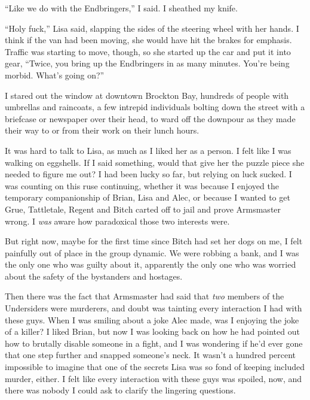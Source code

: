 ``Like we do with the Endbringers,'' I said.  I sheathed my knife.



``Holy fuck,'' Lisa said, slapping the sides of the steering wheel with her hands.  I think if the van had been moving, she would have hit the brakes for emphasis.  Traffic was starting to move, though, so she started up the car and put it into gear, ``Twice, you bring up the Endbringers in as many minutes.  You're being morbid.  What's going on?''



I stared out the window at downtown Brockton Bay, hundreds of people with umbrellas and raincoats, a few intrepid individuals bolting down the street with a briefcase or newspaper over their head, to ward off the downpour as they made their way to or from their work on their lunch hours.



It was hard to talk to Lisa, as much as I liked her as a person.  I felt like I was walking on eggshells.  If I said something, would that give her the puzzle piece she needed to figure me out?  I had been lucky so far, but relying on luck sucked.  I was counting on this ruse continuing, whether it was because I enjoyed the temporary companionship of Brian, Lisa and Alec, or because I wanted to get Grue, Tattletale, Regent and Bitch carted off to jail and prove Armsmaster wrong.  I \emph{was} aware how paradoxical those two interests were.



But right now, maybe for the first time since Bitch had set her dogs on me, I felt painfully out of place in the group dynamic.  We were robbing a bank, and I was the only one who was guilty about it, apparently the only one who was worried about the safety of the bystanders and hostages.



Then there was the fact that Armsmaster had said that \emph{two} members of the Undersiders were murderers, and doubt was tainting every interaction I had with these guys.  When I was smiling about a joke Alec made, was I enjoying the joke of a killer?  I liked Brian, but now I was looking back on how he had pointed out how to brutally disable someone in a fight, and I was wondering if he'd ever gone that one step further and snapped someone's neck.  It wasn't a hundred percent impossible to imagine that one of the secrets Lisa was so fond of keeping included murder, either.  I felt like every interaction with these guys was spoiled, now, and there was nobody I could ask to clarify the lingering questions.



